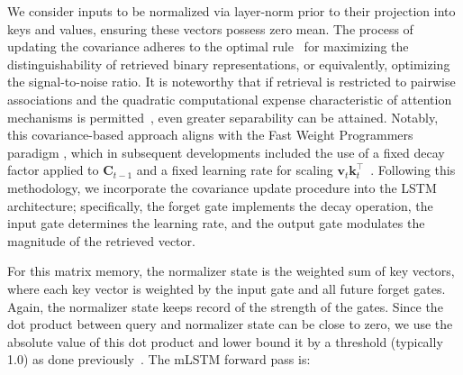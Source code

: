 We consider inputs to be normalized via layer-norm prior to their projection into keys and values, ensuring these vectors possess zero mean. The process of updating the covariance adheres to the optimal rule~\citep{Dayan:91} for maximizing the distinguishability of retrieved binary representations, or equivalently, optimizing the signal-to-noise ratio. It is noteworthy that if retrieval is restricted to pairwise associations and the quadratic computational expense characteristic of attention mechanisms is permitted~\citep{Krotov:16,Krotov:17,Ramsauer:21}, even greater separability can be attained. Notably, this covariance-based approach aligns with the Fast Weight Programmers paradigm \citep{Schmidhuber:92ncfastweights,Schlag:21}, which in subsequent developments included the use of a fixed decay factor applied to $\mathbf{C}_{t-1}$ and a fixed learning rate for scaling 
$\mathbf{v}_{t} \mathbf{k}_t ^\top$~\citep{Ba:16}.
Following this methodology, we incorporate the covariance update procedure into the LSTM architecture; specifically, the forget gate implements the decay operation, the input gate determines the learning rate, and the output gate modulates the magnitude of the retrieved vector.

For this matrix memory, the normalizer state is the weighted sum of key vectors, where each key vector is weighted by the input gate and all future forget gates. Again, the normalizer state keeps record of the strength of the gates. Since the dot product between query and normalizer state can be close to zero, we use the absolute value of this dot product and lower bound it by a threshold (typically 1.0) as done previously~\citep{Sun:23arxiv}. The mLSTM forward pass is:


